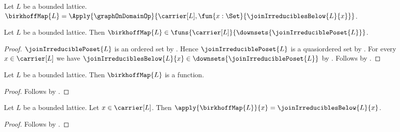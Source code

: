 \begin{definition}\label{birkhoff_map}
    Let $L$ be a bounded lattice.
    $\birkhoffMap{L}
        =\Apply{\graphOnDomainOp}
            {\carrier[L],
             \fun{x:\Set}{\joinIrreduciblesBelow{L}{x}}}$.
\end{definition}

\begin{theorem}\label{birkhoff_map_type}
    Let $L$ be a bounded lattice.
    Then $\birkhoffMap{L}\in
        \funs{\carrier[L]}
            {\downsets{\joinIrreduciblePoset{L}}}$.
\end{theorem}
\begin{proof}
    $\joinIrreduciblePoset{L}$ is an ordered set by
        .
    Hence $\joinIrreduciblePoset{L}$ is a quasiordered set by
        .
    For every $x\in\carrier[L]$ we have
        $\joinIrreduciblesBelow{L}{x}
            \in\downsets{\joinIrreduciblePoset{L}}$ by
        .
    Follows by
        .
\end{proof}

\begin{proposition}\label{birkhoff_map_is_function}
    Let $L$ be a bounded lattice.
    Then $\birkhoffMap{L}$ is a function.
\end{proposition}
\begin{proof}
    Follows by .
\end{proof}

\begin{proposition}\label{birkhoff_map_apply}
    Let $L$ be a bounded lattice.
    Let $x\in\carrier[L]$.
    Then $\apply{\birkhoffMap{L}}{x}=\joinIrreduciblesBelow{L}{x}$.
\end{proposition}
\begin{proof}
    Follows by
        .
\end{proof}

